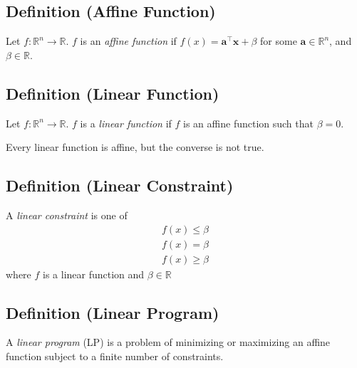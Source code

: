 \begin{defbox}
    \subsection{Definition (Affine Function)}
    Let $f:\mathbb{R}^n\rightarrow\mathbb{R}$. $f$ is an \emph{affine function} if
    $f(x)=\bm{a}^\top \bm{x}+\beta$ for some $\bm{a}\in\mathbb{R}^n$, and $\beta\in\mathbb{R}$.    
\end{defbox}

\begin{defbox}
    \subsection{Definition (Linear Function)}
    Let $f:\mathbb{R}^n\rightarrow\mathbb{R}$. $f$ is a \emph{linear function} if
    $f$ is an affine function such that $\beta=0$.
\end{defbox}

\begin{remark}
    Every linear function is affine, but the converse is not true.
\end{remark}

\begin{defbox}
    \subsection{Definition (Linear Constraint)}
    A \emph{linear constraint} is one of
    \begin{align*}
        f(x)\le \beta\\
        f(x)=\beta\\
        f(x)\ge \beta
    \end{align*}
    where $f$ is a linear function and $ \beta\in\mathbb{R} $
\end{defbox}

\begin{defbox}
    \subsection{Definition (Linear Program)}
    A \emph{linear program} (LP) is a problem of minimizing or
    maximizing an affine function subject to a finite number
    of constraints.
\end{defbox}